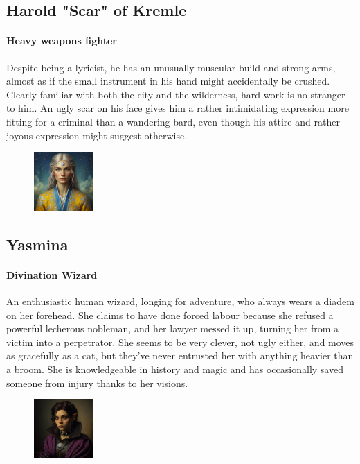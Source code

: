 \documentclass[10pt,onecolumn,twoside,openany,bg=full,layout=true]{dndbook}
\begin{document}
  \subsection {Harold "Scar" of Kremle}\label{subsec:harold-"scar"-of-kremle}
\paragraph{Heavy weapons fighter}
Despite being a lyricist, he has an unusually muscular build and strong arms, almost as if the small instrument in his
hand might accidentally be crushed.
Clearly familiar with both the city and the wilderness, hard work is no stranger to him.
An ugly scar on his face gives him a rather intimidating expression more fitting for a criminal than a wandering bard,
even though his attire and rather joyous expression might suggest otherwise.

  \begin{figure}
    \begin{center}
      \includegraphics[width=0.2\textwidth]{img/yasmina}
    \end{center}
  \end{figure}
  \subsection{Yasmina}\label{subsec:yasmina}

  \paragraph{Divination Wizard}
  An enthusiastic human wizard, longing for adventure, who always wears a diadem on her forehead.
  She claims to have done forced labour because she refused a powerful lecherous nobleman, and her lawyer messed it up,
  turning her from a victim into a perpetrator.
  She seems to be very clever, not ugly either, and moves as gracefully as a cat, but they've never entrusted her
  with anything heavier than a broom.
  She is knowledgeable in history and magic and has occasionally saved someone from injury thanks to her visions.


  \begin{figure}
    \begin{center}
      \includegraphics[width=0.2\textwidth]{img/silgrid}
    \end{center}
  \end{figure}
\end{document}
